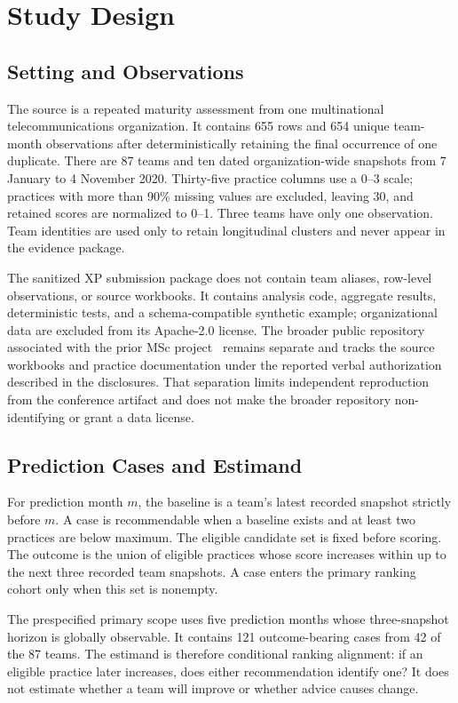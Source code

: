 \documentclass[runningheads]{llncs}
\begin{document}
\section{Study Design}

\subsection{Setting and Observations}

The source is a repeated maturity assessment from one multinational telecommunications organization. It contains 655 rows and 654 unique team-month observations after deterministically retaining the final occurrence of one duplicate. There are 87 teams and ten dated organization-wide snapshots from 7 January to 4 November 2020. Thirty-five practice columns use a 0--3 scale; practices with more than 90\% missing values are excluded, leaving 30, and retained scores are normalized to 0--1. Three teams have only one observation. Team identities are used only to retain longitudinal clusters and never appear in the evidence package.

The sanitized XP submission package does not contain team aliases, row-level observations, or source workbooks. It contains analysis code, aggregate results, deterministic tests, and a schema-compatible synthetic example; organizational data are excluded from its Apache-2.0 license. The broader public repository associated with the prior MSc project~\cite{morabia2026project} remains separate and tracks the source workbooks and practice documentation under the reported verbal authorization described in the disclosures. That separation limits independent reproduction from the conference artifact and does not make the broader repository non-identifying or grant a data license.

\subsection{Prediction Cases and Estimand}

For prediction month $m$, the baseline is a team's latest recorded snapshot strictly before $m$. A case is recommendable when a baseline exists and at least two practices are below maximum. The eligible candidate set is fixed before scoring. The outcome is the union of eligible practices whose score increases within up to the next three recorded team snapshots. A case enters the primary ranking cohort only when this set is nonempty.

The prespecified primary scope uses five prediction months whose three-snapshot horizon is globally observable. It contains 121 outcome-bearing cases from 42 of the 87 teams. The estimand is therefore conditional ranking alignment: if an eligible practice later increases, does either recommendation identify one? It does not estimate whether a team will improve or whether advice causes change.
\end{document}
